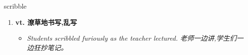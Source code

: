 
\begin{frame}
{\huge scribble}
\begin{center}
\begin{enumerate}\Large
  \item \textbf{vt. 潦草地书写,乱写}
  \begin{itemize}
    \item \em{\Large{Students scribbled furiously as the teacher lectured. 老师一边讲,学生们一边狂抄笔记。}}
  \end{itemize}
\end{enumerate}
\end{center}
\end{frame}

